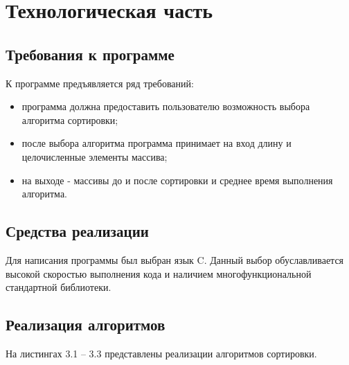 \chapter{Технологическая часть}

\section{Требования к программе}

К программе предъявляется ряд требований:

\begin{itemize}
	\item программа должна предоставить пользователю возможность выбора алгоритма сортировки;
	\item после выбора алгоритма программа принимает на вход длину и целочисленные элементы массива;
	\item на выходе - массивы до и после сортировки и среднее время выполнения алгоритма.
\end{itemize}

\section{Средства реализации}

Для написания программы был выбран язык C. Данный выбор обуславливается высокой скоростью выполнения кода и наличием многофункциональной стандартной библиотеки.

\section{Реализация алгоритмов}

На листингах 3.1 -- 3.3 представлены реализации алгоритмов сортировки.

